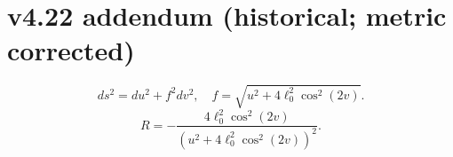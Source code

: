 \documentclass[11pt]{article}
\begin{document}
\section*{v4.22 addendum (historical; metric corrected)}
\[
ds^2=du^2+f^2 dv^2,\quad f=\sqrt{u^2+4\ell_0^2\cos^2(2v)}.
\]
\[
R=-\frac{4\ell_0^2\cos^2(2v)}{(u^2+4\ell_0^2\cos^2(2v))^2}.
\]
\end{document}
